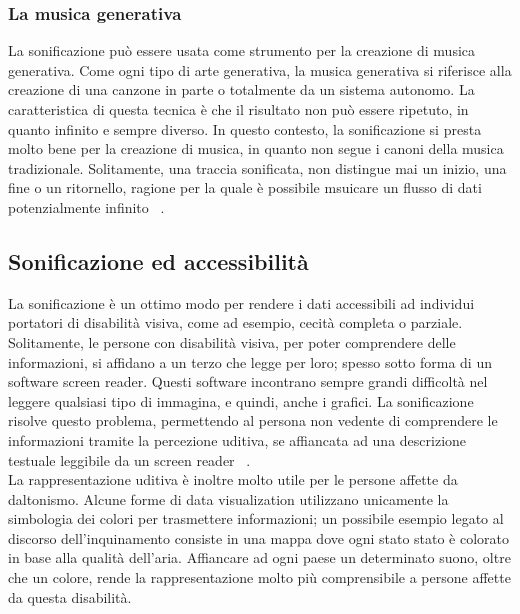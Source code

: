 \subsubsection{La musica generativa}
La sonificazione può essere usata come strumento per la creazione di musica generativa.
Come ogni tipo di arte generativa, la musica generativa si riferisce alla creazione di una canzone in parte o totalmente da un sistema autonomo.
La caratteristica di questa tecnica è che il risultato non può essere ripetuto, in quanto infinito e sempre diverso.
In questo contesto, la sonificazione si presta molto bene per la creazione di musica, in quanto non segue i canoni della musica tradizionale.
Solitamente, una traccia sonificata, non distingue mai un inizio, una fine o un ritornello, ragione per la quale è possibile msuicare un flusso di dati potenzialmente infinito ~\cite{generative_music}.

\subsection{Sonificazione ed accessibilità}
La sonificazione è un ottimo modo per rendere i dati accessibili ad individui portatori di disabilità visiva, come ad esempio, cecità completa o parziale.
Solitamente, le persone con disabilità visiva, per poter comprendere delle informazioni, si affidano a un terzo che legge per loro; spesso sotto forma di un software screen reader.
Questi software incontrano sempre grandi difficoltà nel leggere qualsiasi tipo di immagina, e quindi, anche i grafici.
La sonificazione risolve questo problema, permettendo al persona non vedente di comprendere le informazioni tramite la percezione uditiva, se affiancata ad una descrizione testuale leggibile da un screen reader ~\cite{accessibility}.
\\
La rappresentazione uditiva è inoltre molto utile per le persone affette da daltonismo.
Alcune forme di data visualization utilizzano unicamente la simbologia dei colori per trasmettere informazioni; un possibile esempio legato al discorso dell'inquinamento consiste in una mappa dove ogni stato stato è colorato in base alla qualità dell'aria.
Affiancare ad ogni paese un determinato suono, oltre che un colore, rende la rappresentazione molto più comprensibile a persone affette da questa disabilità.

